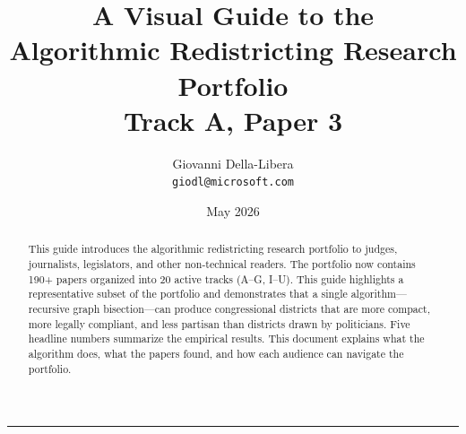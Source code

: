 \documentclass[12pt]{article}
\title{\textbf{A Visual Guide to the\\Algorithmic Redistricting Research Portfolio}\\[6pt]
\large Track A, Paper 3}
\author{Giovanni Della-Libera\\
\small\texttt{giodl@microsoft.com}}
\date{May 2026}
\begin{document}
\maketitle
\thispagestyle{empty}

\begin{abstract}
\noindent
This guide introduces the algorithmic redistricting research portfolio
to judges, journalists, legislators, and other non-technical readers.
The portfolio now contains 190+ papers organized into 20 active tracks (A--G, I--U).
This guide highlights a representative subset of the portfolio and
demonstrates that a single algorithm---recursive graph bisection---can
produce congressional districts that are more compact, more legally compliant,
and less partisan than districts drawn by politicians.
Five headline numbers summarize the empirical results.
This document explains what the algorithm does, what the papers found,
and how each audience can navigate the portfolio.
\end{abstract}

\vspace{6pt}
\hrule
\vspace{6pt}

\tableofcontents

\newpage





\label{sec:findings}










\end{document}
